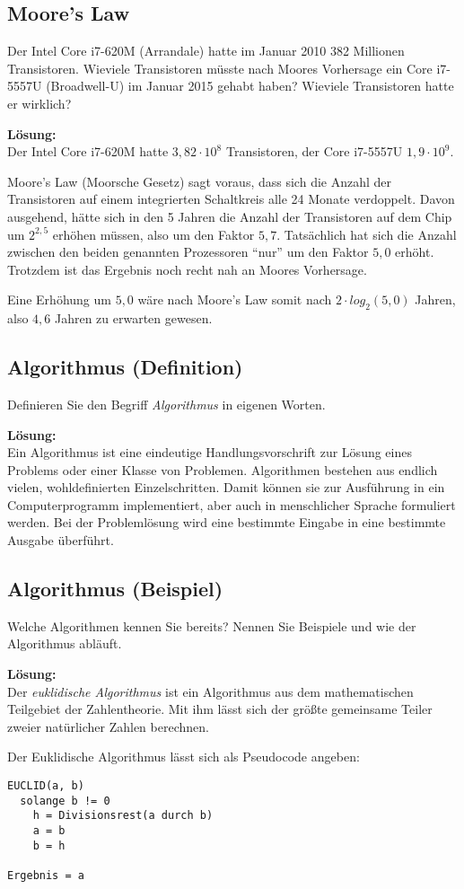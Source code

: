\documentclass[11pt,a4paper,DIV=12]{scrartcl}
\newcommand{\loesung}{\textbf{Lösung:}\\}
\begin{document}
\subsection{Moore's Law}
Der Intel Core i7-620M (Arrandale) hatte im Januar 2010 382 Millionen Transistoren. Wieviele Transistoren müsste nach Moores Vorhersage ein Core i7-5557U (Broadwell-U) im Januar 2015 gehabt haben? Wieviele Transistoren hatte er wirklich?

\loesung
Der Intel Core i7-620M hatte $3{,}82 \cdot 10^8$ Transistoren, der Core i7-5557U $1{,}9 \cdot 10^9$.

Moore's Law (Moorsche Gesetz) sagt voraus, dass sich die Anzahl der Transistoren auf einem integrierten Schaltkreis alle 24 Monate verdoppelt. Davon ausgehend, hätte sich in den 5 Jahren die Anzahl der Transistoren auf dem Chip um $2^{2{,}5}$ erhöhen müssen, also um den Faktor $5{,}7$. Tatsächlich hat sich die Anzahl zwischen den beiden genannten Prozessoren \enquote{nur} um den Faktor $5{,}0$ erhöht. Trotzdem ist das Ergebnis noch recht nah an Moores Vorhersage.

Eine Erhöhung um $5{,}0$ wäre nach Moore's Law somit nach $2 \cdot log_2(5{,}0)$ Jahren, also $4{,}6$ Jahren zu erwarten gewesen.

\subsection{Algorithmus (Definition)}
Definieren Sie den Begriff \emph{Algorithmus} in eigenen Worten.

\loesung
Ein Algorithmus ist eine eindeutige Handlungsvorschrift zur Lösung eines Problems oder einer Klasse von Problemen. Algorithmen bestehen aus endlich vielen, wohldefinierten Einzelschritten. Damit können sie zur Ausführung in ein Computerprogramm implementiert, aber auch in menschlicher Sprache formuliert werden. Bei der Problemlösung wird eine bestimmte Eingabe in eine bestimmte Ausgabe überführt.

\subsection{Algorithmus (Beispiel)}
Welche Algorithmen kennen Sie bereits? Nennen Sie Beispiele und wie der Algorithmus abläuft.

\loesung
Der \emph{euklidische Algorithmus} ist ein Algorithmus aus dem mathematischen Teilgebiet der Zahlentheorie. Mit ihm lässt sich der größte gemeinsame Teiler zweier natürlicher Zahlen berechnen.

Der Euklidische Algorithmus lässt sich als Pseudocode angeben:

\begin{lstlisting}
EUCLID(a, b)
  solange b != 0
    h = Divisionsrest(a durch b)
    a = b
    b = h

Ergebnis = a
\end{lstlisting}

\end{document}
